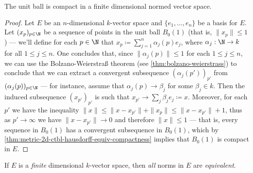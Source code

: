 \begin{corollary}
\label{cor:unit-ball}
The unit ball is compact in a finite dimensional normed vector space.
\end{corollary}

\begin{proof}
Let \(E\) be an \(n\)-dimensional \(k\)-vector space and \(\{e_1, \dots, e_n\}\)
be a basis for \(E\). Let \((x_p)_{p \in \N}\) be a sequence of points in the
unit ball \(B_0(1)\) (that is, \(\| x_{p} \| \leq 1\)) --- we'll define for
each \(p \in \N\) that \(x_p \coloneq \sum_{j=1}^{n} \alpha_j(p) e_j\), where
\(\alpha_j: \N \to k\) for all \(1 \leq j \leq n\). One concludes that, since
\(\| \alpha_j(p) \| \leq 1\) for each \(1 \leq j \leq n\), we can use the
Bolzano-Weierstra{\ss} theorem (see \cref{thm:bolzano-weierstrass}) to conclude
that we can extract a convergent subsequence \((\alpha_j(p'))_{p'}\) from
\((\alpha_j(p))_{p \in \N}\) --- for instance, assume that \(\alpha_j(p) \to
\beta_j\) for some \(\beta_j \in k\). Then the induced subsequence
\((x_{p'})_{p'}\) is such that \(x_{p'} \to \sum_j \beta_j e_j \coloneq
x\). Moreover, for each \(p'\) we have the inequality \(\| x \| \leq \| x -
x_{p'} \| + \| x_{p} \| \leq \| x - x_{p'} \| + 1\), thus as \(p' \to \infty\)
we have \(\| x - x_{p'} \| \to 0\) and therefore \(\| x \| \leq 1\) --- that
is, every sequence in \(B_0(1)\) has a convergent subsequence in \(B_0(1)\),
which by \cref{thm:metric-2d-ctbl-hausdorff-equiv-compactness} implies that
\(B_0(1)\) is compact in \(E\).
\end{proof}

\begin{lemma}
\label{lem:finite-dim-equivalent-norms}
If \(E\) is a \emph{finite} dimensional \(k\)-vector space, then \emph{all}
norms in \(E\) are \emph{equivalent}.
\end{lemma}

